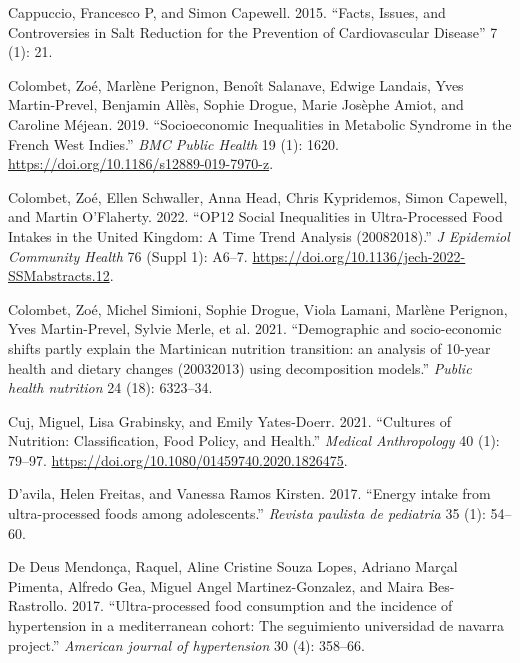 \documentclass[
]{article}
\newlength{\cslhangindent}
\newlength{\cslentryspacingunit} %
\newenvironment{CSLReferences}[2] %
 {%
  \setlength{\parindent}{0pt}
  \ifodd #1
  \let\oldpar\par
  \def\par{\hangindent=\cslhangindent\oldpar}
  \fi
  \setlength{\parskip}{#2\cslentryspacingunit}
 }%
 {}
\begin{document}
\begin{CSLReferences}{1}{0}
\leavevmode{}%
Cappuccio, Francesco P, and Simon Capewell. 2015. {``Facts, Issues, and
Controversies in Salt Reduction for the Prevention of Cardiovascular
Disease''} 7 (1): 21.

\leavevmode{}%
Colombet, Zoé, Marlène Perignon, Benoît Salanave, Edwige Landais, Yves
Martin-Prevel, Benjamin Allès, Sophie Drogue, Marie Josèphe Amiot, and
Caroline Méjean. 2019. {``Socioeconomic Inequalities in Metabolic
Syndrome in the French West Indies.''} \emph{BMC Public Health} 19 (1):
1620. \url{https://doi.org/10.1186/s12889-019-7970-z}.

\leavevmode{}%
Colombet, Zoé, Ellen Schwaller, Anna Head, Chris Kypridemos, Simon
Capewell, and Martin O'Flaherty. 2022. {``OP12 Social Inequalities in
Ultra-Processed Food Intakes in the United Kingdom: A Time Trend
Analysis (2008{\textendash}2018).''} \emph{J Epidemiol Community Health}
76 (Suppl 1): A6--7.
\url{https://doi.org/10.1136/jech-2022-SSMabstracts.12}.

\leavevmode{}%
Colombet, Zoé, Michel Simioni, Sophie Drogue, Viola Lamani, Marlène
Perignon, Yves Martin-Prevel, Sylvie Merle, et al. 2021. {``Demographic
and socio-economic shifts partly explain the Martinican nutrition
transition: an analysis of 10-year health and dietary changes
(2003{\textendash}2013) using decomposition models.''} \emph{Public
health nutrition} 24 (18): 6323--34.

\leavevmode{}%
Cuj, Miguel, Lisa Grabinsky, and Emily Yates-Doerr. 2021. {``Cultures of
Nutrition: Classification, Food Policy, and Health.''} \emph{Medical
Anthropology} 40 (1): 79--97.
\url{https://doi.org/10.1080/01459740.2020.1826475}.

\leavevmode{}%
D'avila, Helen Freitas, and Vanessa Ramos Kirsten. 2017. {``Energy
intake from ultra-processed foods among adolescents.''} \emph{Revista
paulista de pediatria} 35 (1): 54--60.

\leavevmode{}%
De Deus Mendonça, Raquel, Aline Cristine Souza Lopes, Adriano Marçal
Pimenta, Alfredo Gea, Miguel Angel Martinez-Gonzalez, and Maira
Bes-Rastrollo. 2017. {``Ultra-processed food consumption and the
incidence of hypertension in a mediterranean cohort: The seguimiento
universidad de navarra project.''} \emph{American journal of
hypertension} 30 (4): 358--66.


\end{CSLReferences}
\end{document}
